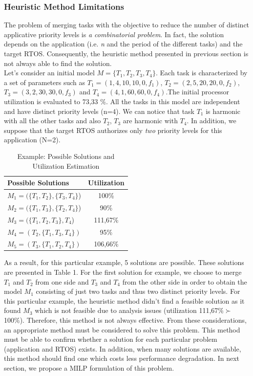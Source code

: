 \documentclass[runningheads,a4paper]{llncs}
\begin{document}
\subsubsection{Heuristic Method Limitations}
The problem of merging tasks with the objective to reduce the number of distinct applicative priority levels is \emph{a combinatorial problem}. In fact, the solution depends on the application (i.e. \emph{n} and the period of the different tasks) and the target RTOS. Consequently, the heuristic method presented in previous section is not always able to find the solution. 
\\Let's consider an initial model $M =\{T_1,T_2,T_3,T_4\}$. Each task is characterized by a set of parameters such as $T_1=(1,4,10,10,0,f_1)$, $T_2=(2,5,20,20,0,f_2)$, $T_3=(3,2,30,30,0,f_3)$ and $T_4=(4,1,60,60,0,f_4)$.The initial processor utilization is evaluated to 73,33 \%.
All the tasks in this model are independent and have distinct priority levels (n=4). We can notice that task $T_1$ is harmonic with all the other tasks and also $T_2$, $T_3$ are harmonic with $T_4$. In addition, we suppose that the target RTOS authorizes only \emph{two} priority levels for this application (N=2). 
\begin{table}[!h]
\caption{Example: Possible Solutions and Utilization Estimation}
\label{table1}
\centering
   \begin{tabular}{ | l || c |}
     \hline
     Possible Solutions & Utilization \\
     \hline
     $M_1 =(\{T_1,T_2\},\{T_3,T_4\}$) &  100\% \\
     \hline
     $M_2 =(\{T_1,T_3\},\{T_2,T_4\}$)& 90\% \\
     \hline
     $M_3 = (\{T_1,T_2,T_3\},T_4$) & 111,67\%\\
     \hline
     $M_4=(T_2,\{T_1,T_3,T_4\})$ & 95\% \\
     \hline
     $M_5= (T_3,\{T_1,T_2,T_4\})$ & 106,66\% \\
     \hline
   \end{tabular}
\end{table}


As a result, for this particular example, 5 solutions are possible. These solutions are presented in Table 1. 
For the first solution for example, we choose to merge $T_1$  and $T_2$  from one side and $T_3$  and $T_4$  from the other side in order to obtain the model $M_1$ consisting of just two tasks and thus two distinct priority levels. For this particular example, the heuristic method didn't find a feasible solution as it found  $M_3$ which is not feasible due to analysis issues (utilization 111,67\%$\succ$ 100\%). Therefore, this method is not always effective. From these considerations, an appropriate method must be considered to solve this problem. This method must be able to confirm whether a solution for each particular problem (application and RTOS) exists. In addition, when many solutions are available, this method should find one which costs less performance degradation. In next section, we propose a MILP formulation of this problem.
\end{document}
